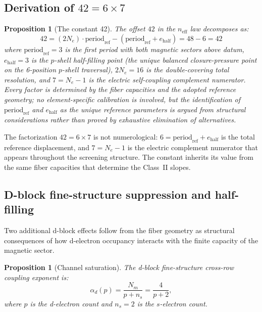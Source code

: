 \documentclass[11pt,a4paper]{article}
\newtheorem{proposition}[theorem]{Proposition}
\begin{document}
\subsection{Derivation of $42 = 6 \times 7$}

\begin{proposition}[The constant 42]
\label{prop:42}
The offset $42$ in the $n_{\mathrm{eff}}$ law decomposes as:
\[
42 = (2N_e) \cdot \mathrm{period}_{\mathrm{ref}} - (\mathrm{period}_{\mathrm{ref}} + e_{\mathrm{half}}) = 48 - 6 = 42
\]
where $\mathrm{period}_{\mathrm{ref}} = 3$ is the first period with both magnetic sectors above datum, $e_{\mathrm{half}} = 3$ is the $p$-shell half-filling point (the unique balanced closure-pressure point on the 6-position $p$-shell traversal), $2N_e = 16$ is the double-covering total resolution, and $7 = N_e - 1$ is the electric self-coupling complement numerator. Every factor is determined by the fiber capacities and the adopted reference geometry; no element-specific calibration is involved, but the identification of $\mathrm{period}_{\mathrm{ref}}$ and $e_{\mathrm{half}}$ as the unique reference parameters is argued from structural considerations rather than proved by exhaustive elimination of alternatives.
\end{proposition}

The factorization $42 = 6 \times 7$ is not numerological: $6 = \mathrm{period}_{\mathrm{ref}} + e_{\mathrm{half}}$ is the total reference displacement, and $7 = N_e - 1$ is the electric complement numerator that appears throughout the screening structure. The constant inherits its value from the same fiber capacities that determine the Class~II slopes.

\subsection{D-block fine-structure suppression and half-filling}
\label{sec:d-block-fs}

Two additional d-block effects follow from the fiber geometry as structural consequences of how d-electron occupancy interacts with the finite capacity of the magnetic sector.

\begin{proposition}[Channel saturation]
\label{prop:channel-sat}
The d-block fine-structure cross-row coupling exponent is:
\[
\alpha_d(p) = \frac{N_m}{p + n_s} = \frac{4}{p + 2},
\]
where $p$ is the d-electron count and $n_s = 2$ is the $s$-electron count.
\end{proposition}
\end{document}
